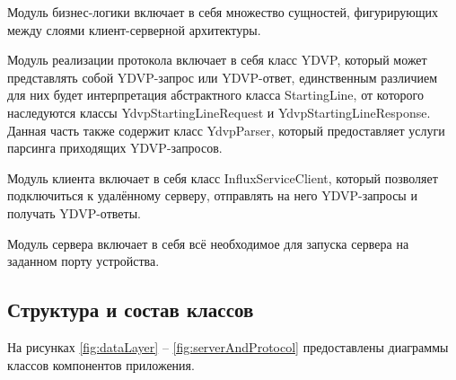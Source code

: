 Модуль бизнес-логики включает в себя множество сущностей, фигурирующих между слоями клиент-серверной архитектуры.

Модуль реализации протокола включает в себя класс YDVP, который может представлять собой YDVP-запрос или YDVP-ответ, единственным различием для них будет интерпретация абстрактного класса StartingLine, от которого наследуются классы YdvpStartingLineRequest и YdvpStartingLineResponse. Данная часть также содержит класс YdvpParser, который предоставляет услуги парсинга приходящих YDVP-запросов.

Модуль клиента включает в себя класс InfluxServiceClient, который позволяет подключиться к удалённому серверу, отправлять на него YDVP-запросы и получать YDVP-ответы. 

Модуль сервера включает в себя всё необходимое для запуска сервера на заданном порту устройства.

\subsection{Структура и состав классов}

На рисунках \ref{fig:dataLayer} -- \ref{fig:serverAndProtocol} предоставлены диаграммы классов компонентов приложения.


